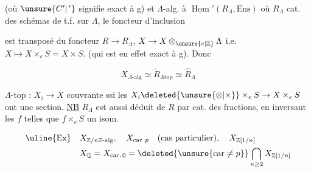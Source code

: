 
(où $\unsure{C'|\,'}$ signifie exact à g) et $\Lambda$-alg. à
$\underline{\operatorname{Hom}}'(R_\Lambda,\mathrm{Ens})$ où $R_\Lambda$ cat. des schémas de t.f. sur $\Lambda$, le foncteur d'inclusion


est transposé du foncteur $R\longrightarrow R_\Lambda$, $X\to X\otimes_{\unsure{e|\mathbb Z}}\Lambda$ i.e.
$X\mapsto X\times_e S=X\times S$. 
(qui est en effet exact à g). Donc

\[
 X_{\Lambda\text{-alg}}\simeq\widetilde R_{\Lambda\mathrm{top}}\simeq\widehat R_\Lambda
\]

$\Lambda$-top : $X_i\to X$ couvrante ssi les $X_i\deleted{\unsure{\otimes|\times}}\times_e S\to X\times_e S$ ont une section.
\uline{NB} $R_\Lambda$ est aussi déduit de $R$ par cat. des fractions, en inversant les $f$ telles que $f\times_e S$ un isom.

\[
\begin{aligned}
 \text{\uline{Ex}}\quad &X_{\mathbb Z/n\mathbb Z\text{-alg}},\quad X_{\mathrm{car}\ p}\quad
 (\text{cas particulier}),\quad X_{\mathbb Z[1/n]}\\
 &X_{\mathbb Q}=X_{\mathrm{car.}\,0}=\deleted{\unsure{\mathrm{car}\neq p}}\bigcap_{n\geq2}X_{\mathbb Z[1/n]}
\end{aligned}
\]

